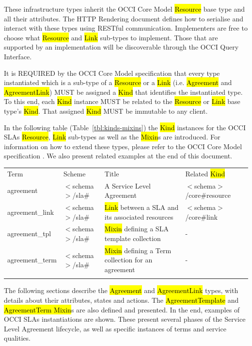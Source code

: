 \documentclass[10pt,a4paper]{article}
\begin{document}
These infrastructure types inherit the OCCI Core Model \hl{Resource}
base type and all their attributes. The HTTP Rendering document
\cite{occi:http_rendering} defines how to serialise and interact with
these types using RESTful communication. Implementers are free to
choose what \hl{Resource} and \hl{Link} sub-types to implement. Those
that are supported by an implementation will be discoverable through
the OCCI Query Interface.

It is REQUIRED by the OCCI Core Model specification that every type instantiated which is a sub-type of a \hl{Resource} or a \hl{Link} (i.e. \hl{Agreement} and \hl{AgreementLink}) MUST be assigned a \hl{Kind} that identifies the instantiated type. To this end, each \hl{Kind} instance MUST be related to the \hl{Resource} or \hl{Link} base type’s \hl{Kind}. That assigned \hl{Kind} MUST be immutable to any client. 

In the following table (Table~\ref{tbl:kinds-mixins}) the \hl{Kind} instances for the OCCI SLAs \hl{Resource}, \hl{Link} sub-types as well as the \hl{Mixin}s are introduced. For information on how to extend these types, please refer to the OCCI Core Model specification \cite{occi:core}. We also present related examples at the end of this document. 


	{
	\begin{tabular}{llll}
	\toprule
	Term & Scheme & Title & Related \hl{Kind} \\
	\colrule
	agreement &  $<$schema$>$/sla\# & A Service Level Agreement	& $<$schema$>$/core\#resource \\
	agreement\_link & $<$schema$>$/sla\# & \hl{Link} between a SLA and its associated resources	& $<$schema$>$/core\#link \\
	agreement\_tpl & $<$schema$>$/sla\# & \hl{Mixin} defining a SLA template collection	& - \\
	agreement\_term & $<$schema$>$/sla\# & \hl{Mixin} defining a Term collection for an agreement	& - \\
	\botrule
	\end{tabular}
}



The following sections describe the \hl{Agreement} and \hl{AgreementLink} types, with details about their attributes, states and actions. The \hl{AgreementTemplate} and \hl{AgreementTerm Mixin}s are also defined and presented. In the end, examples of OCCI SLAs instantiations are shown. These present several phases of the Service Level Agreement lifecycle, as well as specific instances of terms and service qualities. 
\end{document}
